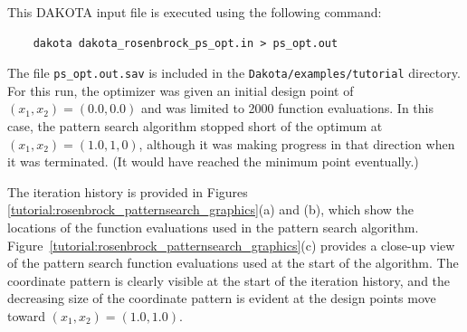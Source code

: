 This DAKOTA input file is executed using the following command:
\begin{small}
\begin{verbatim}
    dakota dakota_rosenbrock_ps_opt.in > ps_opt.out
\end{verbatim}
\end{small}

The file \texttt{ps\_opt.out.sav} is included in the
\texttt{Dakota/examples/tutorial} directory. For this run, the
optimizer was given an initial design point of $(x_1,x_2)
  = (0.0,0.0)$ and was limited to 2000 function evaluations. In this
case, the pattern search algorithm stopped short of the optimum at
$(x_1,x_2) = (1.0,1,0)$, although it was making progress
in that direction when it was terminated.  (It would have
reached the minimum point eventually.)

The iteration history is provided in Figures~
\ref{tutorial:rosenbrock_patternsearch_graphics}(a) and (b), which show
the locations of the function evaluations used in the pattern search
algorithm.
Figure~\ref{tutorial:rosenbrock_patternsearch_graphics}(c)
provides a close-up view of the pattern search function evaluations
used at the start of the algorithm. The coordinate pattern is clearly
visible at the start of the iteration history, and the decreasing size
of the coordinate pattern is evident at the design points move toward
$(x_1,x_2) = (1.0,1.0)$.

